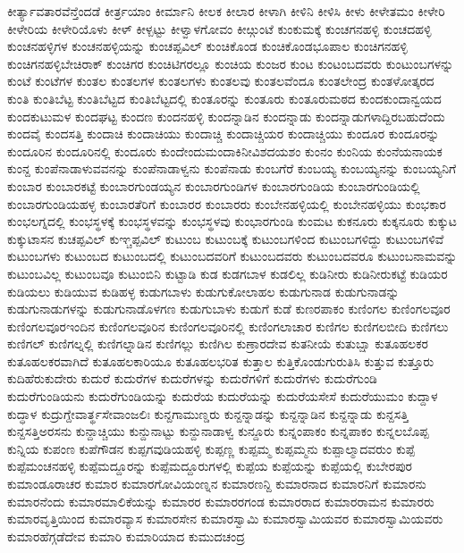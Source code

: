 {ಕೀರ್ತ್ಯಾವತಾರವೆನ್ತೆಂದಡೆ
ಕೀರ್ತ್ರಯಾಂ
ಕೀರ್ಮಾನಿ
ಕೀಲಕ
ಕೀಲಾರ
ಕೀಳಾಗಿ
ಕೀಳಿನಿ
ಕೀಳಿಸಿ
ಕೀಳು
ಕೀಳೇತಮಂ
ಕೀಳೇರಿ
ಕೀಳೇರಿಯ
ಕೀಳೇರಿಯೊಳು
ಕೀಳ್
ಕೀಳ್ಪಟ್ಟು
ಕೀಳ್ವಾಳಗೋವಂ
ಕೀೞ್ಗುಂಟೆ
ಕುಂಕುಮಕ್ಕೆ
ಕುಂಚಗನಹಳ್ಳಿ
ಕುಂಚದಹಳ್ಳಿ
ಕುಂಚನಹಳ್ಳಿಗಳ
ಕುಂಚನಹಳ್ಳಿಯನ್ನು
ಕುಂಚಪ್ಪವಿಲ್
ಕುಂಚಿಕೊಂಡ
ಕುಂಚಿಕೊಂಡಭೂಪಾಲ
ಕುಂಚಿಗನಹಳ್ಳಿ
ಕುಂಚಿಗನಹಳ್ಳಿಬೇಚಿರಾಕ್
ಕುಂಚಿಗರ
ಕುಂಚಿಟಿಗರಲ್ಲೂ
ಕುಂಚಿಯ
ಕುಂಜರ
ಕುಂಟ
ಕುಂಟಂಬದವರು
ಕುಂಟುಂಬಗಳನ್ನು
ಕುಂಟೆ
ಕುಂಟೆಗಳ
ಕುಂತಲ
ಕುಂತಲಗಳ
ಕುಂತಲಗಳು
ಕುಂತಲವು
ಕುಂತಲವೆಂದೂ
ಕುಂತಲೇಂದ್ರ
ಕುಂತಳೋತ್ಕರದ
ಕುಂತಿ
ಕುಂತಿಬೆಟ್ಟ
ಕುಂತಿಬೆಟ್ಟದ
ಕುಂತಿಬೆಟ್ಟದಲ್ಲಿ
ಕುಂತೂರನ್ನು
ಕುಂತೂರು
ಕುಂತೂರುಮಠದ
ಕುಂದಕುಂದಾನ್ವಯದ
ಕುಂದಕುಟುಮಳ
ಕುಂದಘಟ್ಟ
ಕುಂದಣ
ಕುಂದನಹಳ್ಳಿ
ಕುಂದನ್ನಾಡಿನ
ಕುಂದನ್ನಾಡು
ಕುಂದನ್ನಾಡುಗಳಾದ್ದಿರಬಹುದೆಂದು
ಕುಂದವೈ
ಕುಂದಸತ್ತಿ
ಕುಂದಾಚಿ
ಕುಂದಾಚಿಯು
ಕುಂದಾಚ್ಚಿ
ಕುಂದಾಚ್ಚಿಯರ
ಕುಂದಾಚ್ಚಿಯು
ಕುಂದೂರ
ಕುಂದೂರನ್ನು
ಕುಂದೂರಿನ
ಕುಂದೂರಿನಲ್ಲಿ
ಕುಂದೂರು
ಕುಂದೇಂದುಮಂದಾಕಿನೀವಿಶದಯಶಂ
ಕುಂನಂ
ಕುಂನಿಯ
ಕುಂನೆಯನಾಯಕ
ಕುಂನ್ದ
ಕುಂಪೆನಾಡಾಳುವವನನ್ನು
ಕುಂಪೆನಾಡಾಳ್ವನು
ಕುಂಪೆನಾಡು
ಕುಂಬಗೆರೆ
ಕುಂಬಯ್ಯ
ಕುಂಬಯ್ಯನನ್ನು
ಕುಂಬಯ್ಯನಿಗೆ
ಕುಂಬಾರ
ಕುಂಬಾರಕಟ್ಟೆ
ಕುಂಬಾರಗುಂಡಯ್ಯನ
ಕುಂಬಾರಗುಂಡಿಗಳ
ಕುಂಬಾರಗುಂಡಿಯ
ಕುಂಬಾರಗುಂಡಿಯಲ್ಲಿ
ಕುಂಬಾರಗುಂಡಿಯಹಳ್ಳ
ಕುಂಬಾರತೆರಿಗೆ
ಕುಂಬಾರರ
ಕುಂಬಾರರು
ಕುಂಬೇನಹಳ್ಳಿಯಲ್ಲಿ
ಕುಂಬೇನಹಳ್ಳಿಯು
ಕುಂಭಕಾರ
ಕುಂಭಲಗ್ನದಲ್ಲಿ
ಕುಂಭಸ್ಥಳಕ್ಕೆ
ಕುಂಭಸ್ಥಳವನ್ನು
ಕುಂಭಸ್ಥಳವು
ಕುಂಭಾರಗುಂಡಿ
ಕುಂಮಟ
ಕುಕನೂರು
ಕುಕ್ಕನೂರು
ಕುಕ್ಕುಟ
ಕುಕ್ಕುಟಾಸನ
ಕುಚಪ್ಪವಿಲ್
ಕುಞ್ಚಪ್ಪವಿಲ್
ಕುಟುಂಬ
ಕುಟುಂಬಕ್ಕೆ
ಕುಟುಂಬಗಳಿಂದ
ಕುಟುಂಬಗಳಿದ್ದು
ಕುಟುಂಬಗಳಿವೆ
ಕುಟುಂಬಗಳು
ಕುಟುಂಬದ
ಕುಟುಂಬದಲ್ಲಿ
ಕುಟುಂಬದವರಿಗೆ
ಕುಟುಂಬದವರು
ಕುಟುಂಬದವರೂ
ಕುಟುಂಬನಾಮವನ್ನು
ಕುಟುಂಬವಿಲ್ಲ
ಕುಟುಂಬವೂ
ಕುಟುಂಬಿನಿ
ಕುಟ್ಟಾಡಿ
ಕುಡ
ಕುಡಗಬಾಳ
ಕುಡಲಿಲ್ಲ
ಕುಡಿನೀರು
ಕುಡಿನೀರುಕಟ್ಟೆ
ಕುಡಿಯರ
ಕುಡಿಯಲು
ಕುಡಿಯುವ
ಕುಡಿಹಳ್ಳ
ಕುಡುಗಬಾಳು
ಕುಡುಗುಕೋಲಾಹಲ
ಕುಡುಗುನಾಡ
ಕುಡುಗುನಾಡನ್ನು
ಕುಡುಗುನಾಡುಗಳನ್ನು
ಕುಡುಗುನಾಡೊಳಗಣ
ಕುಡುಗುಬಾಳು
ಕುಡುಗೆ
ಕುಡೆ
ಕುಣರಪಾಕಂ
ಕುಣಿಂಗಲ
ಕುಣಿಂಗಲವೂರ
ಕುಣಿಂಗಲವೂರಇಂದಿನ
ಕುಣಿಂಗಲವೂರಿನ
ಕುಣಿಂಗಲವೂರಿನಲ್ಲಿ
ಕುಣಿಂಗಲಾಚಾರ
ಕುಣಿಗಲ
ಕುಣಿಗಲಬೀದಿ
ಕುಣಿಗಲು
ಕುಣಿಗಲ್
ಕುಣಿಗಲ್ನಲ್ಲಿ
ಕುಣಿಗಲ್ನಾಡಿನ
ಕುಣಿಗಲ್ಲು
ಕುಣಿಗಿಲ
ಕುಣ್ರಾರದೇವ
ಕುತನೀಯೆ
ಕುತುಬ್ಷಾ
ಕುತೂಹಲಕರ
ಕುತೂಹಲಕರವಾಗಿದೆ
ಕುತೂಹಲಕಾರಿಯೂ
ಕುತೂಹಲಭರಿತ
ಕುತ್ತಾಲ
ಕುತ್ತಿಕೊಂಡುಗುರುತಿಸಿ
ಕುತ್ತುವ
ಕುತ್ತೂರು
ಕುದಿಹೆರುಕುದೇರು
ಕುದುರೆ
ಕುದುರೆಗಳ
ಕುದುರೆಗಳನ್ನು
ಕುದುರೆಗಳಿಗೆ
ಕುದುರೆಗಳು
ಕುದುರೆಗುಂಡಿ
ಕುದುರೆಗುಂಡಿಯನು
ಕುದುರೆಗುಂಡಿಯನ್ನು
ಕುದುರೆಯ
ಕುದುರೆಯನ್ನು
ಕುದುರೆಯಸೇಸೆ
ಕುದುರೆಯುಮಂ
ಕುದ್ದಾಳ
ಕುದ್ಧಾಳ
ಕುದ್ರುಗ್ದೇವಾರ್ತ್ಥಸೇವಾಂಜಲಿಃ
ಕುನ್ದಗಾಮುಣ್ಡರು
ಕುನ್ದನ್ನಾಡನ್ನು
ಕುನ್ದನ್ನಾಡಿನ
ಕುನ್ದನ್ನಾಡು
ಕುನ್ದಸತ್ತಿ
ಕುನ್ದಸತ್ತಿಅರಸನು
ಕುನ್ದಾಚ್ಚಿಯು
ಕುನ್ದುನಾಟ್ಟು
ಕುನ್ದುನಾಡಾಳ್ವ
ಕುನ್ದೂರು
ಕುನ್ನಂಪಾಕಂ
ಕುನ್ನಪಾಕಂ
ಕುನ್ನಲಬೊಪ್ಪ
ಕುನ್ನಿಯ
ಕುಪಂಣ
ಕುಪೆಗೌಡನ
ಕುಪ್ಪಗವುಡಿಯಹಳ್ಳಿ
ಕುಪ್ಪಣ್ಣ
ಕುಪ್ಪಮ್ಮ
ಕುಪ್ಪಮ್ಮನು
ಕುಪ್ಪಾಲ್ಮಾದವರುಂ
ಕುಪ್ಪೆ
ಕುಪ್ಪೆಮಂಚನಹಳ್ಳಿ
ಕುಪ್ಪೆಮದ್ದೂರನ್ನು
ಕುಪ್ಪೆಮದ್ದೂರುಗಳಲ್ಲಿ
ಕುಪ್ಪೆಯ
ಕುಪ್ಪೆಯನ್ನು
ಕುಪ್ಪೆಯಲ್ಲಿ
ಕುಬೇರಪುರ
ಕುಮಾಂಡೂರಾಚರ
ಕುಮಾರ
ಕುಮಾರಗೋವಿಯಂಣ್ನನ
ಕುಮಾರಣನ್ದಿ
ಕುಮಾರನಾದ
ಕುಮಾರನಿಗೆ
ಕುಮಾರನು
ಕುಮಾರನೆಂದು
ಕುಮಾರಮಾಲಿಕೆಯನ್ನು
ಕುಮಾರರ
ಕುಮಾರರಗಂಡ
ಕುಮಾರರಾದ
ಕುಮಾರರಾಮನ
ಕುಮಾರರು
ಕುಮಾರವೃತ್ತಿಯಿಂದ
ಕುಮಾರವ್ಯಾಸ
ಕುಮಾರಸೇನ
ಕುಮಾರಸ್ವಾಮಿ
ಕುಮಾರಸ್ವಾಮಿಯವರ
ಕುಮಾರಸ್ವಾಮಿಯವರು
ಕುಮಾರಹೆಗ್ಗಡೆದೇವ
ಕುಮಾರಿ
ಕುಮಾರಿಯಾದ
ಕುಮುದಚಂದ್ರ
}
